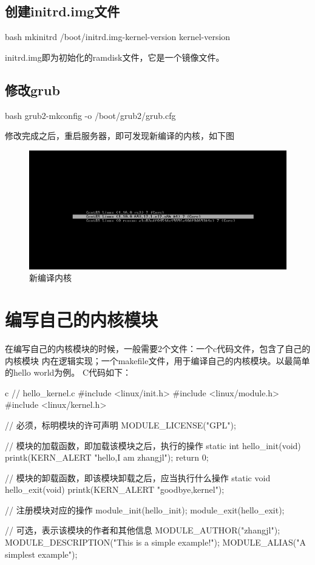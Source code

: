 \subsection{创建initrd.img文件}
\begin{code-block}{bash}
mkinitrd  /boot/initrd.img-{kernel-version} {kernel-version}
\end{code-block}

initrd.img即为初始化的ramdisk文件，它是一个镜像文件。

\subsection{修改grub}
\begin{code-block}{bash}
grub2-mkconfig -o /boot/grub2/grub.cfg
\end{code-block}

修改完成之后，重启服务器，即可发现新编译的内核，如下图
\begin{figure}[H]
  \centering
  \includegraphics[scale=0.2]{new-kernel.png}
  \caption{新编译内核}
  \label{fig:new-kernel}
\end{figure}

\section{编写自己的内核模块}
在编写自己的内核模块的时候，一般需要2个文件：一个c代码文件，包含了自己的内核模块
内在逻辑实现；一个makefile文件，用于编译自己的内核模块。以最简单的hello world为例。
C代码如下：
\begin{code-block}{c}
// hello_kernel.c
#include <linux/init.h>
#include <linux/module.h>
#include <linux/kernel.h>

// 必须，标明模块的许可声明
MODULE_LICENSE("GPL");

// 模块的加载函数，即加载该模块之后，执行的操作
static int hello_init(void)
{
    printk(KERN_ALERT "hello,I am zhangjl\n");
    return 0;
}

// 模块的卸载函数，即该模块卸载之后，应当执行什么操作
static void hello_exit(void)
{
    printk(KERN_ALERT "goodbye,kernel\n");
}

// 注册模块对应的操作
module_init(hello_init);
module_exit(hello_exit);

// 可选，表示该模块的作者和其他信息
MODULE_AUTHOR("zhangjl");
MODULE_DESCRIPTION("This is a simple example!\n");
MODULE_ALIAS("A simplest example");
\end{code-block}

